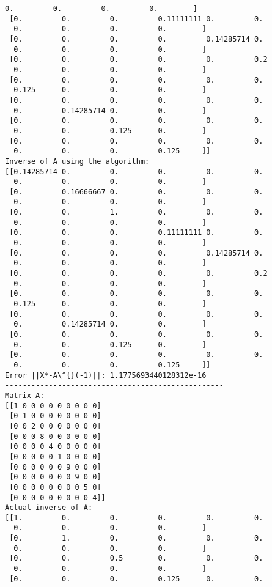 \documentclass[11pt]{article}
\begin{document}
\begin{Verbatim}[commandchars=\\\{\}]
  0.         0.         0.         0.        ]
 [0.         0.         0.         0.11111111 0.         0.
  0.         0.         0.         0.        ]
 [0.         0.         0.         0.         0.14285714 0.
  0.         0.         0.         0.        ]
 [0.         0.         0.         0.         0.         0.2
  0.         0.         0.         0.        ]
 [0.         0.         0.         0.         0.         0.
  0.125      0.         0.         0.        ]
 [0.         0.         0.         0.         0.         0.
  0.         0.14285714 0.         0.        ]
 [0.         0.         0.         0.         0.         0.
  0.         0.         0.125      0.        ]
 [0.         0.         0.         0.         0.         0.
  0.         0.         0.         0.125     ]]
Inverse of A using the algorithm:
[[0.14285714 0.         0.         0.         0.         0.
  0.         0.         0.         0.        ]
 [0.         0.16666667 0.         0.         0.         0.
  0.         0.         0.         0.        ]
 [0.         0.         1.         0.         0.         0.
  0.         0.         0.         0.        ]
 [0.         0.         0.         0.11111111 0.         0.
  0.         0.         0.         0.        ]
 [0.         0.         0.         0.         0.14285714 0.
  0.         0.         0.         0.        ]
 [0.         0.         0.         0.         0.         0.2
  0.         0.         0.         0.        ]
 [0.         0.         0.         0.         0.         0.
  0.125      0.         0.         0.        ]
 [0.         0.         0.         0.         0.         0.
  0.         0.14285714 0.         0.        ]
 [0.         0.         0.         0.         0.         0.
  0.         0.         0.125      0.        ]
 [0.         0.         0.         0.         0.         0.
  0.         0.         0.         0.125     ]]
Error ||X*-A\^{}(-1)||: 1.1775693440128312e-16
--------------------------------------------------
Matrix A:
[[1 0 0 0 0 0 0 0 0 0]
 [0 1 0 0 0 0 0 0 0 0]
 [0 0 2 0 0 0 0 0 0 0]
 [0 0 0 8 0 0 0 0 0 0]
 [0 0 0 0 4 0 0 0 0 0]
 [0 0 0 0 0 1 0 0 0 0]
 [0 0 0 0 0 0 9 0 0 0]
 [0 0 0 0 0 0 0 9 0 0]
 [0 0 0 0 0 0 0 0 5 0]
 [0 0 0 0 0 0 0 0 0 4]]
Actual inverse of A:
[[1.         0.         0.         0.         0.         0.
  0.         0.         0.         0.        ]
 [0.         1.         0.         0.         0.         0.
  0.         0.         0.         0.        ]
 [0.         0.         0.5        0.         0.         0.
  0.         0.         0.         0.        ]
 [0.         0.         0.         0.125      0.         0.

\end{Verbatim}
\end{document}
